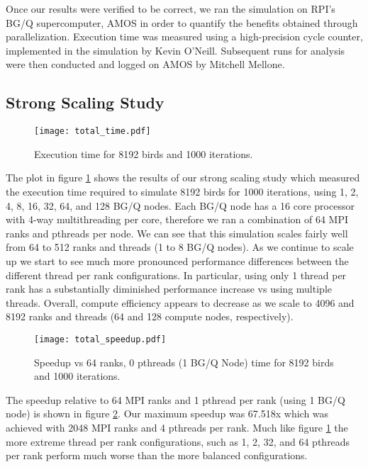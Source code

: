 Once our results were verified to be correct, we ran the simulation on
RPI's BG/Q supercomputer, AMOS in order to quantify the benefits
obtained through parallelization. Execution time was measured using a
high-precision cycle counter, implemented in the simulation by Kevin
O'Neill. Subsequent runs for analysis were then conducted and logged
on AMOS by Mitchell Mellone.

\subsection*{Strong Scaling Study}
\begin{figure}[h!]
  \centering
  \texttt{[image: total\_time.pdf]}
  \caption{Execution time for 8192 birds and 1000 iterations.\label{fig:total}}
\end{figure}

The plot in figure \ref{fig:total} shows the results of our strong scaling study which
measured the execution time required to simulate 8192 birds for 1000 iterations,
using 1, 2, 4, 8, 16, 32, 64, and 128 BG/Q nodes. Each BG/Q node has a 16
core processor with 4-way multithreading per core, therefore we ran a combination
of 64 MPI ranks and pthreads per node. We can see that this simulation scales
fairly well from 64 to 512 ranks and threads (1 to 8 BG/Q nodes). As we continue to
scale up we start to see much more pronounced performance differences between
the different thread per rank configurations. In particular, using only 1 thread
per rank has a substantially diminished performance increase vs using multiple
threads. Overall, compute efficiency appears to decrease as we scale to 4096 and
8192 ranks and threads (64 and 128 compute nodes, respectively).

\begin{figure}[h!]
  \centering
  \texttt{[image: total\_speedup.pdf]}
  \caption{Speedup vs 64 ranks, 0 pthreads (1 BG/Q Node) time for 8192 birds and 1000 iterations.\label{fig:totalspeedup}}
\end{figure}

The speedup relative to 64 MPI ranks and 1 pthread per rank (using 1 BG/Q node)
is shown in figure \ref{fig:totalspeedup}. Our maximum speedup was 67.518x which was
achieved with 2048 MPI ranks and 4 pthreads per rank. Much like figure \ref{fig:total}
the more extreme thread per rank configurations, such as 1, 2, 32, and 64 pthreads
per rank perform much worse than the more balanced configurations.

